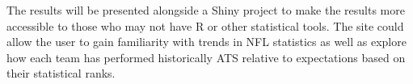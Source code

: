 \documentclass{article}
\begin{document}
The results will be presented alongside a Shiny project to make the results more accessible to
those who may not have R or other statistical tools. The site could allow the user to gain familiarity
with trends in NFL statistics as well as explore how each team has performed historically ATS relative
to expectations based on their statistical ranks.



\end{document}
